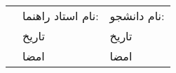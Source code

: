 \newline\newline
\begin{tabular}{m{} m{} m{}}
	&
	نام استاد راهنما: 
	\hspace{0.1cm} \fasupervisor{}
	&
	نام دانشجو: 	
	\hspace{0.1cm} \faAuthor{}
	\\
	&
	تاریخ
	\hspace{.5cm} \faesalattime
	& 
	تاریخ
	\hspace{.5cm} \faesalattime
	\\
	&
	امضا
	&
	امضا
	\\
\end{tabular}